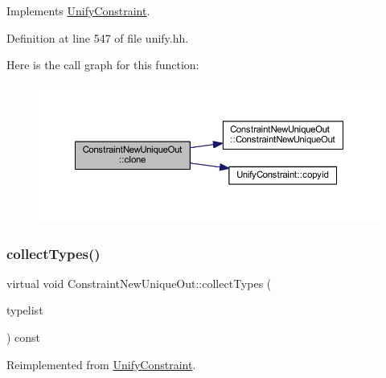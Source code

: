 Implements \mbox{\hyperlink{class_unify_constraint_a4f068343932637d355644bb21559aa12}{Unify\+Constraint}}.



Definition at line 547 of file unify.\+hh.

Here is the call graph for this function\+:
\nopagebreak
\begin{figure}[H]
\begin{center}
\leavevmode
\includegraphics[width=350pt]{class_constraint_new_unique_out_a5c430b42eee12168f0e542f4be6e766b_cgraph}
\end{center}
\end{figure}
\mbox{\label{class_constraint_new_unique_out_aec54f3b89aea6c13fedc58815db4745f}} 
\subsubsection{\texorpdfstring{collectTypes()}{collectTypes()}}
{\footnotesize\ttfamily virtual void Constraint\+New\+Unique\+Out\+::collect\+Types (\begin{DoxyParamCaption}\item[{vector$<$ \mbox{\hyperlink{class_unify_datatype}{Unify\+Datatype}} $>$ \&}]{typelist }\end{DoxyParamCaption}) const\hspace{0.3cm}{\ttfamily [virtual]}}



Reimplemented from \mbox{\hyperlink{class_unify_constraint_acb83b6bea3b21e13054e72ac9cfaba0f}{Unify\+Constraint}}.

\mbox{\label{class_constraint_new_unique_out_abf3ec86b9b2f5317794ab6ba261a66d1}} 
